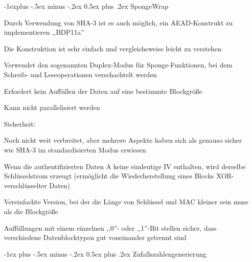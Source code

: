 \documentclass[a4paper]{article}
\makeatletter
\renewcommand{\section}{\@startsection{section}{1}{0mm}%
 {-1ex plus -.5ex minus -.2ex}%
 {0.5ex plus .2ex}%
 {\normalfont\large\bfseries}}
\renewcommand{\subsection}{\@startsection{subsection}{2}{0mm}%
 {-1explus -.5ex minus -.2ex}%
 {0.5ex plus .2ex}%
 {\normalfont\normalsize\bfseries}}
\makeatother
\begin{document}
\begin{multicols}{3}
      \subsection{SpongeWrap}
      \begin{itemize*}
            \item Durch Verwendung von SHA-3 ist es auch möglich, ein AEAD-Konstrukt zu implementieren ,,BDP11a''
            \item Die Konstruktion ist sehr einfach und vergleichsweise leicht zu verstehen
            \item Verwendet den sogenannten Duplex-Modus für Sponge-Funktionen, bei dem Schreib- und Leseoperationen verschachtelt werden
            \item Erfordert kein Auffüllen der Daten auf eine bestimmte Blockgröße
            \item Kann nicht parallelisiert werden
            \item Sicherheit:
            \begin{itemize*}
                  \item Noch nicht weit verbreitet, aber mehrere Aspekte haben sich als genauso sicher wie SHA-3 im standardisierten Modus erwiesen
                  \item Wenn die authentifizierten Daten A keine eindeutige IV enthalten, wird derselbe Schlüsselstrom erzeugt (ermöglicht die Wiederherstellung eines Blocks XOR-verschlüsselter Daten)
                  \item Vereinfachte Version, bei der die Länge von Schlüssel und MAC kleiner sein muss als die Blockgröße
                  \item Auffüllungen mit einem einzelnen ,,0''- oder ,,1''-Bit stellen sicher, dass verschiedene Datenblocktypen gut voneinander getrennt sind
            \end{itemize*}
      \end{itemize*}

      \section{Zufallszahlengenerierung}

\end{multicols}
\end{document}

